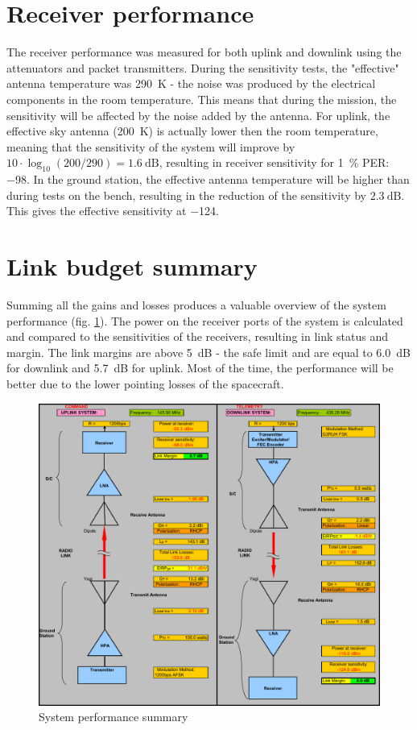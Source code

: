 \section{Receiver performance}
The receiver performance was measured for both uplink and downlink using the attenuators and packet transmitters. During the sensitivity tests, the "effective" antenna temperature was \SI{290}{\kelvin} - the noise was produced by the electrical components in the room temperature. This means that during the mission, the sensitivity will be affected by the noise added by the antenna.
For uplink, the effective sky antenna (\SI{200}{\kelvin}) is actually lower then the room temperature, meaning that the sensitivity of the system will improve by $10\cdot \log_{10}(200/290) = \SI{1.6}{\dB}$, resulting in receiver sensitivity for \SI{1}{\percent} PER: \SI{-98}{\dBm}.
In the ground station, the effective antenna temperature will be higher than during tests on the bench, resulting in the reduction of the sensitivity by $\SI{2.3}{\dB}$. This gives the effective sensitivity at \SI{-124}{\dBm}.

\section{Link budget summary}
Summing all the gains and losses produces a valuable overview of the system performance (fig. \ref{link:link_status}). The power on the receiver ports of the system is calculated and compared to the sensitivities of the receivers, resulting in link status and margin. The link margins are above \SI{5}{\dB} - the safe limit and are equal to \SI{6.0}{\dB} for downlink and \SI{5.7}{\dB} for uplink. Most of the time, the performance will be better due to the lower pointing losses of the spacecraft. 

\begin{figure}
    \centering
    \includegraphics[width=0.8\paperwidth]{img/8/link_summary.pdf}
    \caption{System performance summary}
    \label{link:link_status}
\end{figure}
